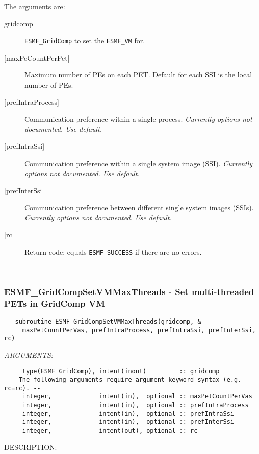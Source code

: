    The arguments are:
   \begin{description}
   \item[gridcomp]
     {\tt ESMF\_GridComp} to set the {\tt ESMF\_VM} for.
   \item[{[maxPeCountPerPet]}]
     Maximum number of PEs on each PET.
     Default for each SSI is the local number of PEs.
   \item[{[prefIntraProcess]}]
     Communication preference within a single process.
     {\em Currently options not documented. Use default.}
   \item[{[prefIntraSsi]}]
     Communication preference within a single system image (SSI).
     {\em Currently options not documented. Use default.}
   \item[{[prefInterSsi]}]
     Communication preference between different single system images (SSIs).
     {\em Currently options not documented. Use default.}
   \item[{[rc]}]
     Return code; equals {\tt ESMF\_SUCCESS} if there are no errors.
   \end{description}
   
 
\mbox{}\hrulefill\ 
 
\subsubsection [ESMF\_GridCompSetVMMaxThreads] {ESMF\_GridCompSetVMMaxThreads - Set multi-threaded PETs in GridComp VM}


  
\begin{verbatim}   subroutine ESMF_GridCompSetVMMaxThreads(gridcomp, &
     maxPetCountPerVas, prefIntraProcess, prefIntraSsi, prefInterSsi, rc)\end{verbatim}{\em ARGUMENTS:}
\begin{verbatim}     type(ESMF_GridComp), intent(inout)         :: gridcomp
 -- The following arguments require argument keyword syntax (e.g. rc=rc). --
     integer,             intent(in),  optional :: maxPetCountPerVas
     integer,             intent(in),  optional :: prefIntraProcess
     integer,             intent(in),  optional :: prefIntraSsi
     integer,             intent(in),  optional :: prefInterSsi
     integer,             intent(out), optional :: rc\end{verbatim}
{\sf DESCRIPTION:\\ }



